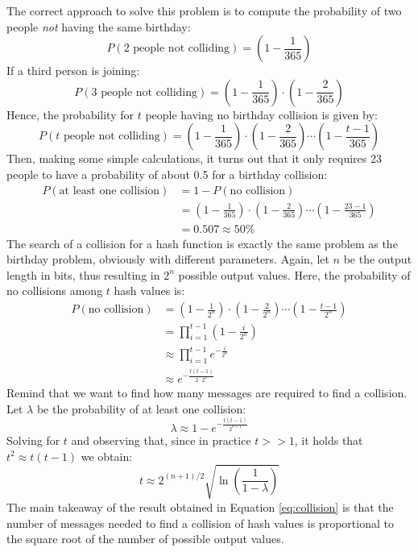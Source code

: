 \bigskip
\noindent
The correct approach to solve this problem is to compute the probability of two people \textit{not} having the same birthday:
$$P(\text{2 people not colliding}) = \left(1-\frac{1}{365} \right)$$
If a third person is joining:
$$P(\text{3 people not colliding}) = \left(1-\frac{1}{365} \right) \cdot \left(1-\frac{2}{365} \right)$$
Hence, the probability for $t$ people having no birthday collision is given by:
$$P(\text{$t$ people not colliding}) = \left(1-\frac{1}{365} \right) \cdot \left(1-\frac{2}{365} \right) \dotsm \left(1-\frac{t-1}{365} \right)$$
Then, making some simple calculations, it turns out that it only requires 23 people to have a probability of about 0.5 for a birthday collision:
\begin{equation*}
\begin{split}
    P(\text{at least one collision}) &= 1 - P(\text{no collision}) \\
            &= \left(1-\frac{1}{365} \right) \cdot \left(1-\frac{2}{365} \right) \dotsm \left(1-\frac{23-1}{365} \right) \\
            &= 0.507 \approx 50 \%
\end{split}
\end{equation*}
The search of a collision for a hash function is exactly the same problem as the birthday problem, obviously with different parameters. Again, let $n$ be the output length in bits, thus resulting in $2^{n}$ possible output values. Here, the probability of no collisions among $t$ hash values is:
\begin{equation*}
\begin{split}
    P(\text{no collision}) &= \left(1-\frac{1}{2^{n}} \right) \cdot \left(1-\frac{2}{2^{n}} \right) \dotsm \left(1-\frac{t-1}{2^{n}} \right) \\
            &= \prod\limits_{i=1}^{t-1} \left(1-\frac{i}{2^{n}} \right) \\
            &\approx \prod\limits_{i=1}^{t-1} e^{- \frac{i}{2^{n}}} \\
            &\approx e^{- \frac{t(t-1)}{2\cdot 2^{n}}}
\end{split}
\end{equation*}
Remind that we want to find how many messages are required to find a collision. Let $\lambda$ be the probability of at least one collision:
$$\lambda \approx 1 - e^{- \frac{t(t-1)}{2^{n+1}}}$$
Solving for $t$ and observing that, since in practice $t>>1$, it holds that $t^{2}\approx t(t-1)$ we obtain:
\begin{equation}
    \label{eq:collision}
    t\approx 2^{(n+1)/2} \sqrt{\ln{\left(\frac{1}{1-\lambda}\right)}}
\end{equation}
The main takeaway of the result obtained in Equation \ref{eq:collision} is that the number of messages needed to find a collision of hash values is proportional to the square root of the number of possible output values.

